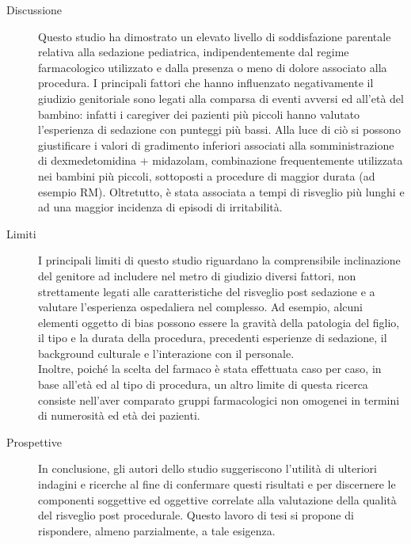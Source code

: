 \begin{description}
\item[Discussione] 
Questo studio ha dimostrato un elevato livello di soddisfazione parentale relativa alla sedazione pediatrica, indipendentemente dal regime farmacologico utilizzato e dalla presenza o meno di dolore associato alla procedura. I principali fattori che hanno influenzato negativamente il giudizio genitoriale sono legati alla comparsa di eventi avversi ed all'età del bambino: infatti i caregiver dei pazienti più piccoli hanno valutato l'esperienza di sedazione con punteggi più bassi.
Alla luce di ciò si possono giustificare i valori di gradimento inferiori associati alla somministrazione di dexmedetomidina + midazolam, combinazione frequentemente utilizzata nei bambini più piccoli, sottoposti a procedure di maggior durata (ad esempio RM). Oltretutto, è stata associata a tempi di risveglio più lunghi e ad una maggior incidenza di episodi di irritabilità. 

\item[Limiti]
I principali limiti di questo studio riguardano la comprensibile inclinazione del genitore ad includere nel metro di giudizio diversi fattori, non strettamente legati alle caratteristiche del risveglio post sedazione e a valutare l'esperienza ospedaliera nel complesso. Ad esempio, alcuni elementi oggetto di bias possono essere la gravità della patologia del figlio, il tipo e la durata della procedura, precedenti esperienze di sedazione, il background culturale e l'interazione con il personale. 
\\Inoltre, poiché la scelta del farmaco è stata effettuata caso per caso, in base all'età ed al tipo di procedura, un altro limite di questa ricerca consiste nell'aver comparato gruppi farmacologici non omogenei in termini di numerosità ed età dei pazienti.
\item[Prospettive] 

In conclusione, gli autori dello studio suggeriscono l'utilità di ulteriori indagini e ricerche al fine di confermare questi risultati e per discernere le componenti soggettive ed oggettive correlate alla valutazione della qualità del risveglio post procedurale. Questo lavoro di tesi si propone di rispondere, almeno parzialmente, a tale esigenza.


\end{description}



